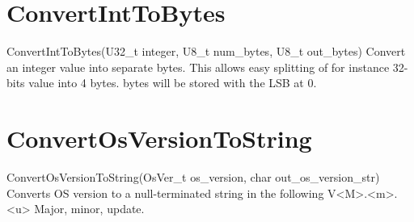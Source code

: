 \section{ConvertIntToBytes}
\label{func:ConvertIntToBytes}
\begin{pdfunction}
{ConvertIntToBytes(U32\_t integer, U8\_t num\_bytes,  U8\_t out\_bytes) }
{ 
Convert an integer value into separate bytes. This allows 
easy splitting of for instance 32-bits value into 4 bytes. 
bytes will be stored with the LSB at 0. }
\end{pdfunction}

\section{ConvertOsVersionToString}
\label{func:ConvertOsVersionToString}
\begin{pdfunction}
{ConvertOsVersionToString(OsVer\_t os\_version,  char out\_os\_version\_str) }
{ 
Converts OS version to a null-terminated string in the following 
V<M>.<m>.<u> Major, minor, update. }
\end{pdfunction}
